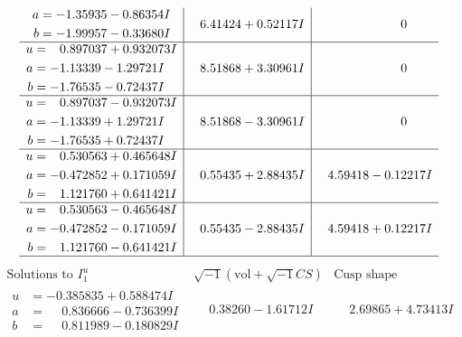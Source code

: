 \documentclass[1p]{elsarticle_modified}
\theoremstyle{definition}
\newcommand{\I}{\sqrt{-1}}
\begin{document}
$$\begin{array}{c|c|c}
\begin{aligned}
a &= -1.35935 - 0.86354 I \\
b &= -1.99957 - 0.33680 I\end{aligned}
 & \phantom{-}6.41424 + 0.52117 I & \phantom{-0.000000 } 0 \\ \hline\begin{aligned}
u &= \phantom{-}0.897037 + 0.932073 I \\
a &= -1.13339 - 1.29721 I \\
b &= -1.76535 - 0.72437 I\end{aligned}
 & \phantom{-}8.51868 + 3.30961 I & \phantom{-0.000000 } 0 \\ \hline\begin{aligned}
u &= \phantom{-}0.897037 - 0.932073 I \\
a &= -1.13339 + 1.29721 I \\
b &= -1.76535 + 0.72437 I\end{aligned}
 & \phantom{-}8.51868 - 3.30961 I & \phantom{-0.000000 } 0 \\ \hline\begin{aligned}
u &= \phantom{-}0.530563 + 0.465648 I \\
a &= -0.472852 + 0.171059 I \\
b &= \phantom{-}1.121760 + 0.641421 I\end{aligned}
 & \phantom{-}0.55435 + 2.88435 I & \phantom{-}4.59418 - 0.12217 I \\ \hline\begin{aligned}
u &= \phantom{-}0.530563 - 0.465648 I \\
a &= -0.472852 - 0.171059 I \\
b &= \phantom{-}1.121760 - 0.641421 I\end{aligned}
 & \phantom{-}0.55435 - 2.88435 I & \phantom{-}4.59418 + 0.12217 I\\
 \hline 
 \end{array}$$\newpage$$\begin{array}{c|c|c}  
\text{Solutions to }I^u_{1}& \I (\text{vol} + \sqrt{-1}CS) & \text{Cusp shape}\\
 \hline 
\begin{aligned}
u &= -0.385835 + 0.588474 I \\
a &= \phantom{-}0.836666 - 0.736399 I \\
b &= \phantom{-}0.811989 - 0.180829 I\end{aligned}
 & \phantom{-}0.38260 - 1.61712 I & \phantom{-}2.69865 + 4.73413 I \\ \hline\begin{aligned}

\end{aligned}
\end{array}$$
\end{document}
